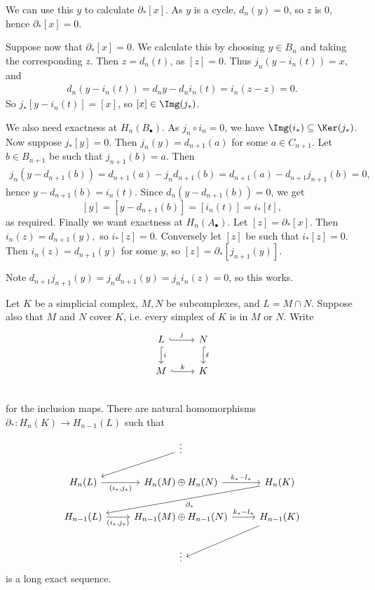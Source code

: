 \documentclass[12pt]{article}
\begin{document}
\begin{proofbox}
	We can use this $y$ to calculate $\partial_\ast[x]$. As $y$ is a cycle, $d_n(y) = 0$, so $z$ is $0$, hence $\partial_\ast[x] = 0$.

	Suppose now that $\partial_\ast[x] = 0$. We calculate this by choosing $y \in B_n$ and taking the corresponding $z$. Then $z = d_n(t)$, as $[z] = 0$. Thus $j_n(y - i_n(t)) = x$, and
	\begin{align*}
		d_n(y - i_n(t)) = d_n y - d_n i_n(t) = i_n(z - z) = 0.
	\end{align*}
	So $j_\ast[y - i_n(t)] = [x]$, so $[x] \in \Img(j_\ast)$.

	We also need exactness at $H_n(B_\bullet)$. As $j_n \circ i_n = 0$, we have $\Img(i_\ast) \subseteq \Ker(j_\ast)$. Now suppose $j_\ast[y] = 0$. Then $j_n(y) = d_{n+1}(a)$ for some $a \in C_{n+1}$. Let $b \in B_{n+1}$ be such that $j_{n+1}(b) = a$. Then
	\begin{align*}
		j_n(y - d_{n+1}(b)) = d_{n+1}(a) - j_n d_{n+1}(b) = d_{n+1}(a) - d_{n+1} j_{n+1}(b) = 0,
	\end{align*}
	hence $y - d_{n+1}(b) = i_n(t)$. Since $d_n(y - d_{n+1}(b)) = 0$, we get
	\[
		[y] = [y - d_{n+1}(b)] = [i_n(t)] = i_\ast[t],
	\]
	as required. Finally we want exactness at $H_n(A_\bullet)$. Let $[z] = \partial_\ast[x]$. Then $i_n(z) = d_{n+1}(y),$ so $i_\ast[z] = 0$. Conversely let $[z]$ be such that $i_\ast[z] = 0$. Then $i_n(z) = d_{n+1}(y)$ for some $y$, so $[z] = \partial_\ast[j_{n+1}(y)]$.

	Note $d_{n+1} j_{n+1}(y) = j_n d_{n+1}(y) = j_n i_n(z) = 0$, so this works.
\end{proofbox}


\begin{theorem}
	Let $K$ be a simplicial complex, $M, N$ be subcomplexes, and $L = M \cap N$. Suppose also that $M$ and $N$ cover $K$, i.e. every simplex of $K$ is in $M$ or $N$. Write
	\begin{equation*}
	\begin{tikzcd}
		L \arrow[r, "j", hook] \arrow[d, "i", hook] & N \arrow[d, "\ell", hook] \\
		M \arrow[r, "k", hook] & K  \\
	\end{tikzcd}
	\end{equation*}
	for the inclusion maps. There are natural homomorphisms $\partial_\ast : H_n(K) \to H_{n-1}(L)$ such that
	\begin{equation*}
	\begin{tikzcd}
			& \vdots \arrow[dl] & \\
		H_n(L) \arrow[r, "{(i_\ast, j_\ast)}"'] & H_n(M) \oplus H_n(N) \arrow[r, "k_\ast - l_\ast"] & H_n(K) \arrow[dll, "\partial_\ast"] \\
					    H_{n-1}(L) \arrow[r, "{(i_\ast, j_\ast)}"'] & H_{n-1}(M) \oplus H_{n-1}(N) \arrow[r, "k_\ast - l_\ast"] & H_{n-1}(K) \arrow[dl] \\
						    & \vdots &
	\end{tikzcd}
	\end{equation*}
	is a long exact sequence.
\end{theorem}
\end{document}

